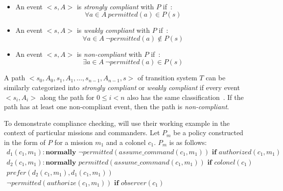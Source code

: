 \begin{definition}
    \label{def:authorization_event_compliance}
    ~

    \begin{itemize}
        \item An event $<s, A>$ is \textit{strongly compliant} with $P$ if~\citep{gelfond_authorization_2008}:
            \begin{equation}
                \forall a \in A\ permitted(a) \in P(s)
            \end{equation}
        \item An event $<s, A>$ is \textit{weakly compliant} with $P$ if~\citep{gelfond_authorization_2008}:
            \begin{equation}
                \forall a \in A\ \neg permitted(a) \not \in P(s)
            \end{equation}
        \item An event $<s, A>$ is \textit{non-compliant} with $P$ if~\citep{gelfond_authorization_2008}:
            \begin{equation}
                \exists a \in A\ \neg permitted(a) \in P(s)
            \end{equation}
    \end{itemize}
\end{definition}

\begin{definition}
    \label{def:authorization_path_compliance}
    A path $<s_0, A_0, s_1, A_1, \dots, s_{n-1}, A_{n-1}, s>$ of transition system $T$ can be similarly categorized into \textit{strongly compliant} or \textit{weakly compliant} if every event $<s_i, A_i>$ along the path for $0 \le i < n$ also has the same classification~\citep{gelfond_authorization_2008}.
    If the path has at least one non-compliant event, then the path is \textit{non-compliant}.
\end{definition}

To demonstrate compliance checking, \citet{gelfond_authorization_2008} will use their working example in the context of particular missions and commanders.
Let $P_m$ be a policy constructed in the form of $P$ for a mission $m_1$ and a colonel $c_1$.
$P_m$ is as follows:
\begin{gather}
    d_1(c_1, m_1): \textbf{normally } \neg permitted(assume\_command(c_1, m_1)) \textbf{ if } authorized(c_1, m_1) \\
    d_2(c_1, m_1): \textbf{normally } permitted(assume\_command(c_1, m_1)) \textbf{ if } colonel(c_1) \\
    prefer(d_2(c_1,m_1),d_1(c_1,m_1)) \\
    \neg permitted(authorize(c_1, m_1)) \textbf{ if } observer(c_1)
\end{gather}

